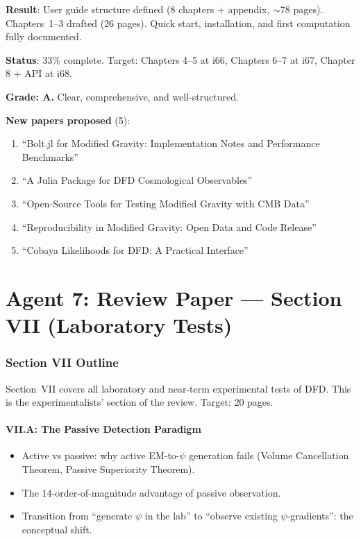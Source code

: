 \documentclass[11pt,a4paper]{article}
\begin{document}
\begin{tcolorbox}[colback=green!5!white, colframe=green!60!black, title={Agent 6: Software Documentation BEGUN}]
\textbf{Result}: User guide structure defined (8 chapters + appendix, $\sim$78 pages). Chapters~1--3 drafted (26 pages). Quick start, installation, and first computation fully documented.

\textbf{Status}: 33\% complete. Target: Chapters 4--5 at i66, Chapters 6--7 at i67, Chapter 8 + API at i68.

\textbf{Grade: A.} Clear, comprehensive, and well-structured.

\textbf{New papers proposed} (5):
\begin{enumerate}
\item ``Bolt.jl for Modified Gravity: Implementation Notes and Performance Benchmarks''
\item ``A Julia Package for DFD Cosmological Observables''
\item ``Open-Source Tools for Testing Modified Gravity with CMB Data''
\item ``Reproducibility in Modified Gravity: Open Data and Code Release''
\item ``Cobaya Likelihoods for DFD: A Practical Interface''
\end{enumerate}
\end{tcolorbox}


\part{Agent 7: Review Paper --- Section VII (Laboratory Tests)}
\label{part:review-VII}

\section{Section VII Outline}

Section~VII covers all laboratory and near-term experimental tests of DFD. This is the experimentalists' section of the review. Target: 20 pages.

\subsection{VII.A: The Passive Detection Paradigm}

\begin{itemize}
\item Active vs passive: why active EM-to-$\psi$ generation fails (Volume Cancellation Theorem, Passive Superiority Theorem).
\item The 14-order-of-magnitude advantage of passive observation.
\item Transition from ``generate $\psi$ in the lab'' to ``observe existing $\psi$-gradients'': the conceptual shift.
\end{itemize}
\end{document}
